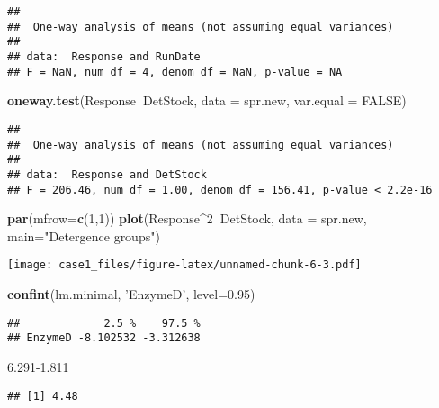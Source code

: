 \documentclass[
]{article}
\newenvironment{Shaded}{\begin{snugshade}}{\end{snugshade}}
\newcommand{\DataTypeTok}[1]{\textcolor[rgb]{0.13,0.29,0.53}{#1}}
\newcommand{\DecValTok}[1]{\textcolor[rgb]{0.00,0.00,0.81}{#1}}
\newcommand{\FloatTok}[1]{\textcolor[rgb]{0.00,0.00,0.81}{#1}}
\newcommand{\KeywordTok}[1]{\textcolor[rgb]{0.13,0.29,0.53}{\textbf{#1}}}
\newcommand{\NormalTok}[1]{#1}
\newcommand{\OperatorTok}[1]{\textcolor[rgb]{0.81,0.36,0.00}{\textbf{#1}}}
\newcommand{\OtherTok}[1]{\textcolor[rgb]{0.56,0.35,0.01}{#1}}
\newcommand{\StringTok}[1]{\textcolor[rgb]{0.31,0.60,0.02}{#1}}
\begin{document}
\begin{verbatim}
## 
##  One-way analysis of means (not assuming equal variances)
## 
## data:  Response and RunDate
## F = NaN, num df = 4, denom df = NaN, p-value = NA
\end{verbatim}

\begin{Shaded}
\begin{Highlighting}[]
\KeywordTok{oneway.test}\NormalTok{(Response}\OperatorTok{~}\NormalTok{DetStock, }\DataTypeTok{data =}\NormalTok{ spr.new, }\DataTypeTok{var.equal =} \OtherTok{FALSE}\NormalTok{)}
\end{Highlighting}
\end{Shaded}

\begin{verbatim}
## 
##  One-way analysis of means (not assuming equal variances)
## 
## data:  Response and DetStock
## F = 206.46, num df = 1.00, denom df = 156.41, p-value < 2.2e-16
\end{verbatim}

\begin{Shaded}
\begin{Highlighting}[]
\KeywordTok{par}\NormalTok{(}\DataTypeTok{mfrow=}\KeywordTok{c}\NormalTok{(}\DecValTok{1}\NormalTok{,}\DecValTok{1}\NormalTok{))}
\KeywordTok{plot}\NormalTok{(Response}\OperatorTok{^}\DecValTok{2}\OperatorTok{~}\NormalTok{DetStock, }\DataTypeTok{data =}\NormalTok{ spr.new, }\DataTypeTok{main=}\StringTok{"Detergence groups"}\NormalTok{)}
\end{Highlighting}
\end{Shaded}

\texttt{[image: case1\_files/figure-latex/unnamed-chunk-6-3.pdf]}

\begin{Shaded}
\begin{Highlighting}[]
\KeywordTok{confint}\NormalTok{(lm.minimal, }\StringTok{'EnzymeD'}\NormalTok{, }\DataTypeTok{level=}\FloatTok{0.95}\NormalTok{)}
\end{Highlighting}
\end{Shaded}

\begin{verbatim}
##             2.5 %    97.5 %
## EnzymeD -8.102532 -3.312638
\end{verbatim}

\begin{Shaded}
\begin{Highlighting}[]
\FloatTok{6.291-1.811}
\end{Highlighting}
\end{Shaded}

\begin{verbatim}
## [1] 4.48
\end{verbatim}
\end{document}
